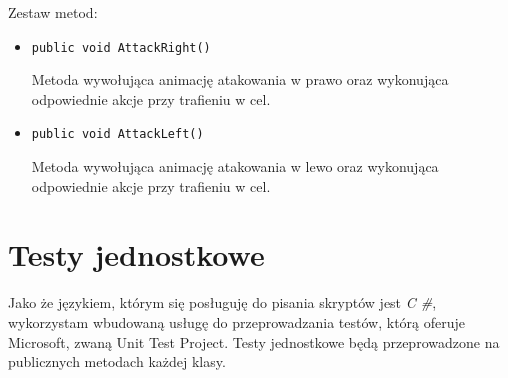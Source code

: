 \documentclass[12pt, a4paper]{article}
\begin{document}
\begin{enumerate}
Zestaw metod$\colon$

\begin{itemize}
\item \texttt{public void AttackRight()}

Metoda wywołująca animację atakowania w prawo oraz wykonująca odpowiednie 
akcje przy trafieniu w cel.

\item \texttt{public void AttackLeft()}

Metoda wywołująca animację atakowania w lewo oraz wykonująca odpowiednie 
akcje przy trafieniu w cel.

\end{itemize}

\end{enumerate}

\section{Testy jednostkowe}

Jako że językiem, którym się posługuję do pisania skryptów jest \textit{C
\#}, wykorzystam wbudowaną usługę do przeprowadzania testów, którą oferuje 
Microsoft, zwaną Unit Test Project. Testy jednostkowe będą przeprowadzone na 
publicznych metodach każdej klasy.
\end{document}

